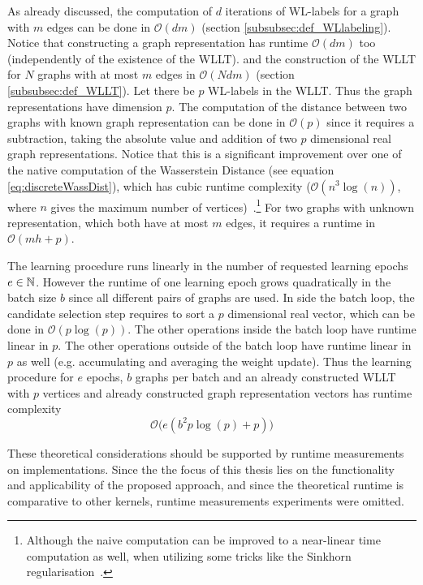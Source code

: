 	As already discussed, the computation of $d$ iterations of WL-labels for a graph with $m$ edges can be done in $\mathcal{O}(dm)$ (section \ref{subsubsec:def_WLlabeling}).
	Notice that constructing a graph representation has runtime $\mathcal{O}(dm)$ too (independently of the existence of the WLLT).
	and the construction of the WLLT for $N$ graphs with at most $m$ edges in $\mathcal{O}(Ndm)$ (section \ref{subsubsec:def_WLLT}).
	Let there be $p$ WL-labels in the WLLT.
	Thus the graph representations have dimension $p$.
	The computation of the distance between two graphs with known graph representation can be done in $\mathcal{O}(p)$ since it requires a subtraction, taking the absolute value and addition of two $p$ dimensional real graph representations.
	Notice that this is a significant improvement over one of the native computation of the Wasserstein Distance (see equation \ref{eq:discreteWassDist}), which has cubic runtime complexity ($\mathcal{O}(n^3 \log(n))$, where $n$ gives the maximum number of vertices)~\cite{2019_Togninalli_NIPS}.\footnote{Although the naive computation can be improved to a near-linear time computation as well, when utilizing some tricks like the Sinkhorn regularisation~\cite{2019_Togninalli_NIPS}.}	
	For two graphs with unknown representation, which both have at most $m$ edges, it requires a runtime in $\mathcal{O}(mh+p)$.
	
	The learning procedure runs linearly in the number of requested learning epochs $e\in\mathbb{N}$.
	However the runtime of one learning epoch grows quadratically in the batch size $b$ since all different pairs of graphs are used.
	In side the batch loop, the candidate selection step requires to sort a $p$ dimensional real vector, which can be done in $\mathcal{O}(p\log(p))$.
	The other operations inside the batch loop have runtime linear in $p$.
	The other operations outside of the batch loop have runtime linear in $p$ as well (e.g. accumulating and averaging the weight update).
	Thus the learning procedure for $e$ epochs, $b$ graphs per batch and an already constructed WLLT with $p$ vertices and already constructed graph representation vectors has runtime complexity
	\[ \mathcal{O}\big(e(b^2 p\log(p) + p)\big) \]
	
	These theoretical considerations should be supported by runtime measurements on implementations.
	Since the the focus of this thesis lies on the functionality and applicability of the proposed approach, and since the theoretical runtime is comparative to other kernels,
	runtime measurements experiments were omitted.
	
